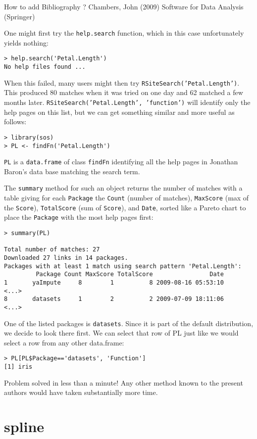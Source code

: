 How to add Bibliography ?
Chambers, John (2009) Software for Data Analysis (Springer)

One might first try the {\tt help.search} function, which 
in this case unfortunately yields nothing:  
\begin{verbatim}
> help.search('Petal.Length')
No help files found ...
\end{verbatim}
When this failed, many users might then try
{\tt RSiteSearch('Petal.Length')}.  This produced 80 matches when 
it was tried on one day and 62 matched a few months later.
{\tt RSiteSearch('Petal.Length', 'function')} will identify
only the help pages on this list, but we can get something
similar and more useful as follows:
\begin{verbatim}
> library(sos)
> PL <- findFn('Petal.Length')
\end{verbatim}
{\tt PL} is a {\tt data.frame} of class {\tt findFn} identifying
all the help pages in Jonathan Baron's data base matching the
search term.

The {\tt summary} method for such an object returns
the number of matches with a table giving for each {\tt Package}
the {\tt Count} (number of matches), {\tt MaxScore} (max of the
{\tt Score}), {\tt TotalScore} (sum of {\tt Score}), and {\tt Date},
sorted like a Pareto chart to place the {\tt Package} with the most
help pages first:
\begin{verbatim}
> summary(PL)

Total number of matches: 27
Downloaded 27 links in 14 packages.
Packages with at least 1 match using search pattern 'Petal.Length':
         Package Count MaxScore TotalScore                Date
1       yaImpute     8        1          8 2009-08-16 05:53:10
<...>
8       datasets     1        2          2 2009-07-09 18:11:06
<...>
\end{verbatim}
One of the listed packages is {\tt datasets}.  Since it is part of the
default \R{} distribution, we decide to look there first.  We can
select that row of PL just like we would select a row from any other
data.frame:
\begin{verbatim}
> PL[PL$Package=='datasets', 'Function']
[1] iris
\end{verbatim}
Problem solved in less than a minute!  Any other method known
to the present authors would have taken substantially more time.

\section*{spline}

